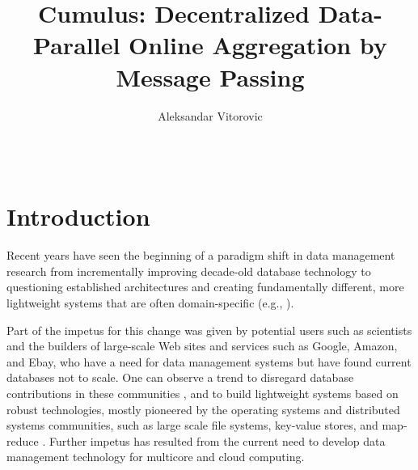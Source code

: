 \documentclass{sig-semester}
\title{Cumulus: Decentralized Data-Parallel Online Aggregation by Message Passing}
\author{\alignauthor Aleksandar Vitorovic \\[1ex]
\affaddr{Dept.\ of Computer Science} \\
\affaddr{EPFL} \\
\affaddr{aleksandar.vitorovic@epfl.ch}
}
\begin{document}
\maketitle






\section{Introduction}
\vspace{2mm}

Recent years have seen the beginning of a paradigm shift in data management research from incrementally improving decade-old database technology to questioning established architectures  and creating fundamentally different, more lightweight systems that are often domain-specific (e.g.,
\cite{DBLP:conf/vldb/StonebrakerMAHHH07,DBLP:journals/pvldb/KallmanKNPRZJMSZHA08}).

Part of the impetus for this change was given by potential users such as scientists and the builders of large-scale Web sites and services such as Google, Amazon, and Ebay, who have a need for data management systems but have found current databases not to scale. One can observe a trend to disregard database contributions in these communities \cite{dbcolumn, DBLP:conf/sigmod/PavloPRADMS09}, and to build lightweight systems based on robust technologies, mostly pioneered by the operating systems and distributed systems communities, such as large scale file systems, key-value stores, and map-reduce \cite{DBLP:journals/cacm/DeanG08, DBLP:journals/tocs/ChangDGHWBCFG08}. Further impetus has resulted from the current need to develop data management technology for multicore and cloud computing.
\end{document}
